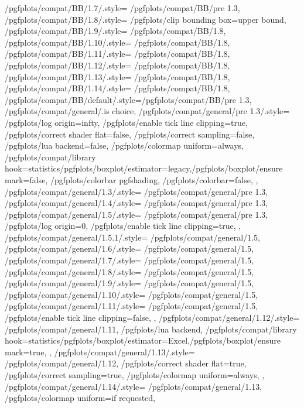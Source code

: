 {	/pgfplots/compat/BB/1.7/.style=	{/pgfplots/compat/BB/pre 1.3},%
	/pgfplots/compat/BB/1.8/.style=	{/pgfplots/clip bounding box=upper bound},%
	/pgfplots/compat/BB/1.9/.style=	{/pgfplots/compat/BB/1.8},%
	/pgfplots/compat/BB/1.10/.style=	{/pgfplots/compat/BB/1.8},%
	/pgfplots/compat/BB/1.11/.style=	{/pgfplots/compat/BB/1.8},%
	/pgfplots/compat/BB/1.12/.style=	{/pgfplots/compat/BB/1.8},%
	/pgfplots/compat/BB/1.13/.style=	{/pgfplots/compat/BB/1.8},%
	/pgfplots/compat/BB/1.14/.style=	{/pgfplots/compat/BB/1.8},%
	/pgfplots/compat/BB/default/.style={/pgfplots/compat/BB/pre 1.3},
	/pgfplots/compat/general/.is choice,
	/pgfplots/compat/general/pre 1.3/.style={
		/pgfplots/log origin=infty,
		/pgfplots/enable tick line clipping=true,
		/pgfplots/correct shader flat=false,
		/pgfplots/correct sampling=false,
		/pgfplots/lua backend=false,
		/pgfplots/colormap uniform=always,
		/pgfplots/compat/library hook={statistics}{/pgfplots/boxplot/estimator=legacy,/pgfplots/boxplot/ensure mark=false},
		/pgfplots/colorbar pgfshading,
		/pgfplots/colorbar=false,
	},%
	/pgfplots/compat/general/1.3/.style=	{/pgfplots/compat/general/pre 1.3},
	/pgfplots/compat/general/1.4/.style=	{/pgfplots/compat/general/pre 1.3},%
	/pgfplots/compat/general/1.5/.style=	{
		/pgfplots/compat/general/pre 1.3,
		/pgfplots/log origin=0,
		/pgfplots/enable tick line clipping=true,
	},%
	/pgfplots/compat/general/1.5.1/.style=	{/pgfplots/compat/general/1.5},%
	/pgfplots/compat/general/1.6/.style=	{/pgfplots/compat/general/1.5},%
	/pgfplots/compat/general/1.7/.style=	{/pgfplots/compat/general/1.5},%
	/pgfplots/compat/general/1.8/.style=	{/pgfplots/compat/general/1.5},%
	/pgfplots/compat/general/1.9/.style=	{/pgfplots/compat/general/1.5},%
	/pgfplots/compat/general/1.10/.style=	{/pgfplots/compat/general/1.5},%
	/pgfplots/compat/general/1.11/.style=	{
		/pgfplots/compat/general/1.5,
		/pgfplots/enable tick line clipping=false,
	},%
	/pgfplots/compat/general/1.12/.style=	{
		/pgfplots/compat/general/1.11,
		/pgfplots/lua backend,
		/pgfplots/compat/library hook={statistics}{/pgfplots/boxplot/estimator=Excel,/pgfplots/boxplot/ensure mark=true},
	},%
	/pgfplots/compat/general/1.13/.style=	{%
		/pgfplots/compat/general/1.12,
		/pgfplots/correct shader flat=true,
		/pgfplots/correct sampling=true,
		/pgfplots/colormap uniform=always,
	},%
	/pgfplots/compat/general/1.14/.style=	{%
		/pgfplots/compat/general/1.13,
		/pgfplots/colormap uniform=if requested,
}}
